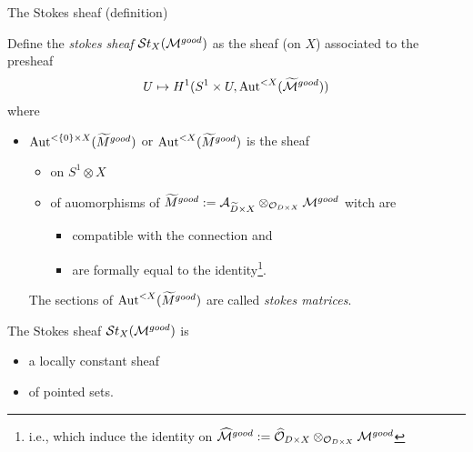 \begin{frame}[t]{The Stokes sheaf (definition)}
  \begin{defn}
    Define the \emph{stokes sheaf} $\mathcal{S}{}t_X(\mathcal{M}^{good})$ as the sheaf (on $X$)
    associated to the presheaf
    \[
      U\mapsto H^1(S^1\times U,\operatorname{Aut}^{<X}(\widetilde {\mathcal{M}}^{good}) )
    \]
    where
    \begin{itemize}
      \item $\operatorname{Aut}^{<\{0\}\times X}(\widetilde M^{good})$ or
        $\operatorname{Aut}^{<X}(\widetilde M^{good})$ is the sheaf
        \begin{itemize}
          \item on $S^1\otimes X$
          \item of auomorphisms of $\widetilde M^{good}:=\mathcal{A}_{\widetilde D\times
            X}\otimes_{\mathcal{O}_{D\times X}}\mathcal{M}^{good}$
            witch are
            \begin{itemize}
              \item compatible with the connection and
              \item are formally equal to the identity\footnote{i.e., which
                induce the identity on $\widehat {\mathcal{M}}^{good}:=\widehat {\mathcal{O}}_{D\times
                X}\otimes_{\mathcal{O}_{D\times X}}\mathcal{M}^{good}$}.
            \end{itemize}
        \end{itemize}
        The sections of $\operatorname{Aut}^{<X}(\widetilde M^{good})$ are called \emph{stokes
        matrices}.
    \end{itemize}
  \end{defn}
  \begin{thm}
    The Stokes sheaf $\mathcal{S}{}t_X(\mathcal{M}^{good})$ is
    \begin{itemize}
      \item a locally constant sheaf
      \item of pointed sets.
    \end{itemize}
  \end{thm}
\end{frame}

